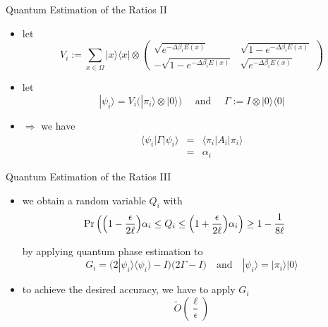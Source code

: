 \documentclass[slideColor]{prosper}
\renewcommand{\>}{\rangle}
\newcommand{\<}{\langle}
\begin{document}

\begin{slide}{Quantum Estimation of the Ratios II}
\begin{itemize}
\item let 
\[
V_i := \sum_{x\in\Omega} |x\>\<x| \otimes
\left(
\begin{array}{cc}
 \sqrt{e^{-\Delta\beta_i E(x)}}   & \sqrt{1-e^{-\Delta\beta_i E(x)}} \\
-\sqrt{1-e^{-\Delta\beta_i E(x)}} & \sqrt{e^{-\Delta\beta_i E(x)}}
\end{array}
\right)
\]

\medskip
\item let 
\[
|\psi_i\> = V_i \Big( |\pi_i\> \otimes |0\> \Big) \quad \mbox{ and } \quad \Gamma := I \otimes |0\>\<0|
\]

\medskip
\item $\Rightarrow$ we have
\begin{eqnarray*}
\<\psi_i|\Gamma|\psi_i\> & = & \<\pi_i|A_i|\pi_i\> \\
& = & \alpha_i
\end{eqnarray*}
\end{itemize}
\end{slide}


\begin{slide}{Quantum Estimation of the Ratios III}
\begin{itemize}

\item we obtain a random variable $Q_i$ with
\[
\hspace{-0.5cm}
\Pr\left( \Big(1-\frac{\epsilon}{2\ell}\Big)\alpha_i \le Q_i \le \Big(1+\frac{\epsilon}{2\ell}\Big)\alpha_i \right) \ge 1 - \frac{1}{8\ell}
\]

\medskip
by applying quantum phase estimation to 
\[
G_i = \big(2|\psi_i\>\<\psi_i)-I\big) \big( 2\Gamma - I \big) \quad\mbox{and}\quad
|\psi_i\> = |\pi_i\>|0\>
\]

\medskip
\item to achieve the desired accuracy, we have to apply $G_i$ 
\[
\tilde{O}\left(\frac{\ell}{\epsilon}\right)
\]
\end{itemize}
\end{slide}

\end{document}
